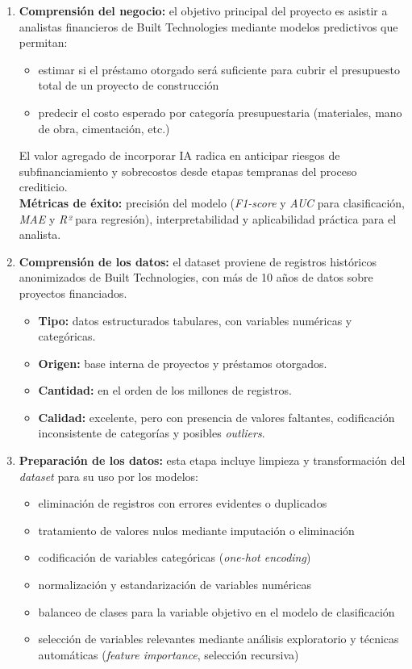 \documentclass[
11pt, %
]{charter}
\begin{document}
\begin{enumerate}
  \item \textbf{Comprensión del negocio:}  
  el objetivo principal del proyecto es asistir a analistas financieros de Built Technologies mediante modelos predictivos que permitan:
  \begin{itemize}
    \item estimar si el préstamo otorgado será suficiente para cubrir el presupuesto total de un proyecto de construcción
    \item predecir el costo esperado por categoría presupuestaria (materiales, mano de obra, cimentación, etc.)
  \end{itemize}
  El valor agregado de incorporar IA radica en anticipar riesgos de subfinanciamiento y sobrecostos desde etapas tempranas del proceso crediticio.\\
  \textbf{Métricas de éxito:} precisión del modelo (\textit{F1-score} y \textit{AUC} para clasificación, \textit{MAE} y \textit{R²} para regresión), interpretabilidad y aplicabilidad práctica para el analista.

  \item \textbf{Comprensión de los datos:}  
  el dataset proviene de registros históricos anonimizados de Built Technologies, con más de 10 años de datos sobre proyectos financiados.  
  \begin{itemize}
    \item \textbf{Tipo:} datos estructurados tabulares, con variables numéricas y categóricas.
    \item \textbf{Origen:} base interna de proyectos y préstamos otorgados.
    \item \textbf{Cantidad:} en el orden de los millones de registros.
    \item \textbf{Calidad:} excelente, pero con presencia de valores faltantes, codificación inconsistente de categorías y posibles \textit{outliers}.
  \end{itemize}

  \item \textbf{Preparación de los datos:}  
  esta etapa incluye limpieza y transformación del \textit{dataset} para su uso por los modelos:
  \begin{itemize}
    \item eliminación de registros con errores evidentes o duplicados
    \item tratamiento de valores nulos mediante imputación o eliminación
    \item codificación de variables categóricas (\textit{one-hot encoding})
    \item normalización y estandarización de variables numéricas
    \item balanceo de clases para la variable objetivo en el modelo de clasificación
    \item selección de variables relevantes mediante análisis exploratorio y técnicas automáticas (\textit{feature importance}, selección recursiva)
  \end{itemize}


\end{enumerate}
\end{document}

